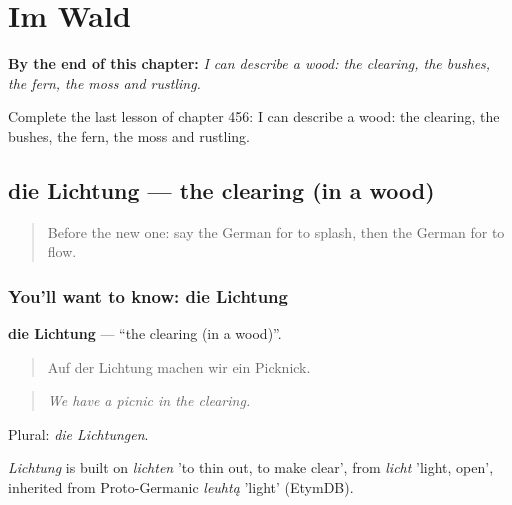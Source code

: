 
\chapter{Im Wald}
\label{ch:ge-im-wald}

\begin{chapteropening}
\textbf{By the end of this chapter:} \emph{I can describe a wood: the clearing, the bushes, the fern, the moss and rustling.}

Complete the last lesson of chapter 456: I can describe a wood: the clearing, the bushes, the fern, the moss and rustling.
\end{chapteropening}

\section[die Lichtung]{die Lichtung — the clearing (in a wood)}

\label{lesson:GE-C456-lichtung}



\begin{quote}
Before the new one: say the German for to splash, then the German for to flow.
\end{quote}

\subsection*{You'll want to know: die Lichtung}
\textbf{die Lichtung} — \textquotedblleft{}the clearing (in a wood)\textquotedblright{}.

\begin{quote}
Auf der Lichtung machen wir ein Picknick.
\end{quote}

\begin{quote}
\emph{We have a picnic in the clearing.}
\end{quote}

Plural: \emph{die Lichtungen}.

\begin{cousinweb}
\emph{Lichtung} is built on \emph{lichten} 'to thin out, to make clear', from \emph{licht} 'light, open', inherited from Proto-Germanic \emph{leuhtą} 'light' (EtymDB).
\end{cousinweb}

